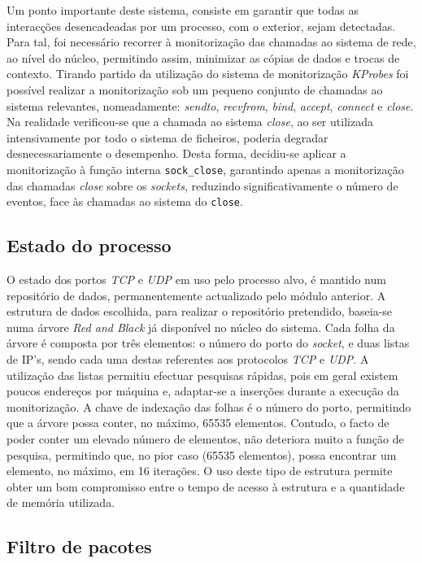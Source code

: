 \documentclass[a4paper]{llncs}
\begin{document}
Um ponto importante deste sistema, consiste em garantir que todas as interacções desencadeadas por um processo, com o exterior, sejam detectadas.
 Para tal, foi necessário recorrer à monitorização das chamadas ao sistema de rede, ao nível do núcleo, permitindo assim, minimizar as cópias de dados e trocas de contexto.
 Tirando partido da utilização do sistema de monitorização \textit{KProbes} foi possível realizar a monitorização sob um pequeno conjunto de chamadas ao sistema relevantes, nomeadamente: \textit{sendto}, \textit{recvfrom}, \textit{bind}, \textit{accept}, \textit{connect} e \textit{close}.
 Na realidade verificou-se que a chamada ao sistema \textit{close}, ao ser utilizada intensivamente por todo o sistema de ficheiros, poderia degradar desnecessariamente o desempenho.
 Desta forma, decidiu-se aplicar a monitorização à função interna \texttt{sock\_close}, garantindo apenas a monitorização das chamadas \textit{close} sobre os \textit{sockets}, reduzindo significativamente o número de eventos, face às chamadas ao sistema do \texttt{close}.

\subsection*{Estado do processo}
\label{sub:data_repository}

O estado dos portos \textit{TCP} e \textit{UDP} em uso pelo processo alvo, é mantido num repositório de dados, permanentemente actualizado pelo módulo anterior. 
 A estrutura de dados escolhida, para realizar o repositório pretendido, baseia-se numa árvore \textit{Red and Black} já disponível no núcleo do sistema.
 Cada folha da árvore é composta por três elementos: o número do porto do \textit{socket}, e duas listas de IP's, sendo cada uma destas referentes aos protocolos \textit{TCP} e \textit{UDP}.
 A utilização das listas permitiu efectuar pesquisas rápidas, pois em geral existem poucos endereços por máquina e, adaptar-se a inserções durante a execução da monitorização.
 A chave de indexação das folhas é o número do porto, permitindo que a árvore possa conter, no máximo, 65535 elementos.
 Contudo, o facto de poder conter um elevado número de elementos, não deteriora muito a função de pesquisa, permitindo que, no pior caso (65535 elementos), possa encontrar um elemento, no máximo, em 16 iterações.
  O uso deste tipo de estrutura permite obter um bom compromisso entre o tempo de acesso à estrutura e a quantidade de memória utilizada.


\subsection*{Filtro de pacotes}
\label{sub:packet_filter}
\end{document}
